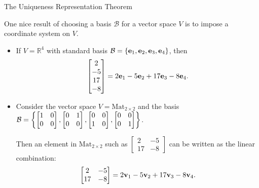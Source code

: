 \documentclass[xcolor=dvipsnames,aspectratio=169,t]{beamer}
\begin{document}
\begin{frame}{The Uniqueness Representation Theorem}

{\small One nice result of choosing a basis $\mathcal{B}$ for a vector space $V$ is to impose a \alert{coordinate system} on $V$.}

  \begin{example}
  {\small 
  \begin{itemize}
  \item
  If $V = \mathbb{R}^4$ with standard basis 
  $\mathcal{B} = \left\{ \mathbf{e}_1, \mathbf{e}_2, \mathbf{e}_3, \mathbf{e}_4 \right\}$, then
  \[ \begin{bmatrix} 2 \\ -5 \\ 17 \\ -8 \end{bmatrix} = 2 \mathbf{e}_1 - 5 \mathbf{e}_2 + 17  \mathbf{e}_3 - 8  \mathbf{e}_4.\]
  
  \item 
  Consider the vector space $V = \mbox{Mat}_{2 \times 2}$ and the basis $\displaystyle \mathcal{B} = \left\{ \begin{bmatrix} 1 & 0 \\ 0 & 0 \end{bmatrix} , \begin{bmatrix} 0 & 1 \\ 0 & 0 \end{bmatrix} ,  \begin{bmatrix} 0 & 0 \\ 1 & 0 \end{bmatrix} ,  \begin{bmatrix} 0 & 0 \\ 0 & 1 \end{bmatrix} \right\}$.

  Then an element in $\mbox{Mat}_{2 \times 2}$ such as $\begin{bmatrix} 2 & -5 \\ 17 & -8 \end{bmatrix}$ can be written as the linear combination:
  \[ \begin{bmatrix} 2 & -5 \\ 17 & -8 \end{bmatrix} = 2 \mathbf{v}_1 -5  \mathbf{v}_2 + 17 \mathbf{v}_3 -8 \mathbf{v}_4. \]

  \end{itemize}
  }
  \end{example} 

\end{frame}
\end{document}

